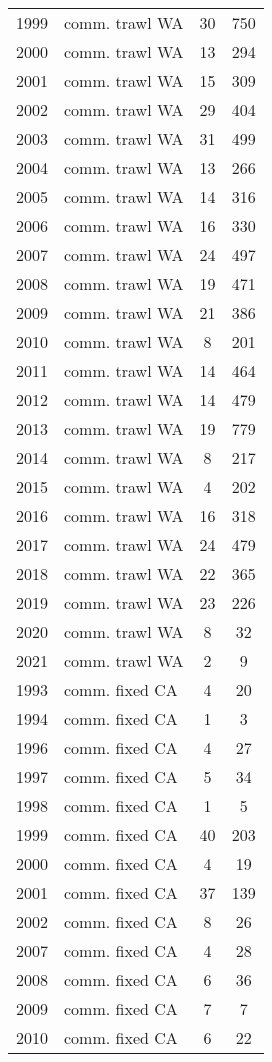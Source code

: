 \begin{longtable}[t]{c>{\centering\arraybackslash}p{4cm}cc}
1999 & comm. trawl WA & 30 & 750\\
2000 & comm. trawl WA & 13 & 294\\
2001 & comm. trawl WA & 15 & 309\\
2002 & comm. trawl WA & 29 & 404\\
2003 & comm. trawl WA & 31 & 499\\
2004 & comm. trawl WA & 13 & 266\\
2005 & comm. trawl WA & 14 & 316\\
2006 & comm. trawl WA & 16 & 330\\
2007 & comm. trawl WA & 24 & 497\\
2008 & comm. trawl WA & 19 & 471\\
2009 & comm. trawl WA & 21 & 386\\
2010 & comm. trawl WA & 8 & 201\\
2011 & comm. trawl WA & 14 & 464\\
2012 & comm. trawl WA & 14 & 479\\
2013 & comm. trawl WA & 19 & 779\\
2014 & comm. trawl WA & 8 & 217\\
2015 & comm. trawl WA & 4 & 202\\
2016 & comm. trawl WA & 16 & 318\\
2017 & comm. trawl WA & 24 & 479\\
2018 & comm. trawl WA & 22 & 365\\
2019 & comm. trawl WA & 23 & 226\\
2020 & comm. trawl WA & 8 & 32\\
2021 & comm. trawl WA & 2 & 9\\
1993 & comm. fixed CA & 4 & 20\\
1994 & comm. fixed CA & 1 & 3\\
1996 & comm. fixed CA & 4 & 27\\
1997 & comm. fixed CA & 5 & 34\\
1998 & comm. fixed CA & 1 & 5\\
1999 & comm. fixed CA & 40 & 203\\
2000 & comm. fixed CA & 4 & 19\\
2001 & comm. fixed CA & 37 & 139\\
2002 & comm. fixed CA & 8 & 26\\
2007 & comm. fixed CA & 4 & 28\\
2008 & comm. fixed CA & 6 & 36\\
2009 & comm. fixed CA & 7 & 7\\
2010 & comm. fixed CA & 6 & 22\\

\end{longtable}
